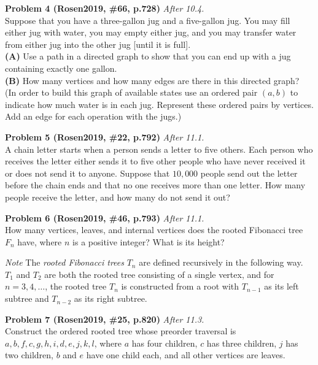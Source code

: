 \documentclass[jou]{apa6}
\begin{document}
\vspace{6pt}
{\bf Problem 4 (Rosen2019, \#66, p.728)} \textendash{} {\em After 10.4.}\\
Suppose that you have a three-gallon jug and a five-gallon jug. 
You may fill either jug with water, you may empty either 
jug, and you may transfer water from either jug into the other jug [until it is full].\\ 
{\bf (A)} Use a path in a directed graph to show that you can end up with a jug containing
exactly one gallon.\\
{\bf (B)} How many vertices and how many edges are there in this directed graph?\\
(In order to build this graph of available states
use an ordered pair $(a,b)$ to indicate how much water is in each jug. Represent these ordered
pairs by vertices. Add an edge for each operation with the jugs.)

\vspace{6pt}
{\bf Problem 5 (Rosen2019, \#22, p.792)} \textendash{} {\em After 11.1.}\\
A chain letter starts when a person sends a letter to five others. 
Each person who receives the letter either sends it to five other people
who have never received it or does not send it to anyone. Suppose that 
$10,000$ people send out the letter before the chain ends and that no one receives
more than one letter. How many people receive the letter, and how many 
do not send it out?


\vspace{6pt}
{\bf Problem 6 (Rosen2019, \#46, p.793)} \textendash{} {\em After 11.1.}\\
How many vertices, leaves, and internal vertices does the rooted Fibonacci tree
$F_n$ have, where $n$ is a positive integer? What is its height?

{\em Note} The {\em rooted Fibonacci trees} $T_n$ are defined recursively 
in the following way. $T_1$ and $T_2$ are both the rooted tree consisting
of a single vertex, and for $n=3,4,\ldots$, the rooted tree $T_n$ 
is constructed from a root with $T_{n-1}$ as its left subtree and $T_{n-2}$
as its right subtree.



\vspace{6pt}
{\bf Problem 7 (Rosen2019, \#25, p.820)} \textendash{} {\em After 11.3.}\\
Construct the ordered rooted tree whose preorder traversal is 
$a,b,f,c,g,h,i,d,e,j,k,l$, where $a$ has four children, $c$ has three children, 
$j$ has two children, $b$ and $e$ have one child each, and all other vertices are leaves.
\end{document}
